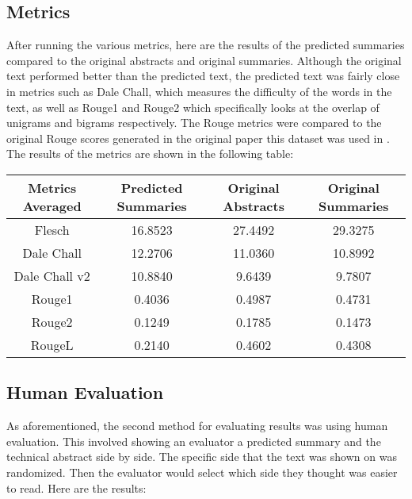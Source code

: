 \documentclass[11pt,a4paper]{article}
\begin{document}
\subsection{Metrics}

\indent \indent After running the various metrics, here are the results of the predicted summaries compared to the original abstracts and original summaries. Although the original text performed better than the predicted text, the predicted text was fairly close in metrics such as Dale Chall, which measures the difficulty of the words in the text, as well as Rouge1 and Rouge2 which specifically looks at the overlap of unigrams and bigrams respectively. The Rouge metrics were compared to the original Rouge scores generated in the original paper this dataset was used in \cite{luo2022readability}. The results of the metrics are shown in the following table:

\begin{table}
  \begin{center}
    \begin{adjustbox}{width=0.49\textwidth}
      \begin{tabular}{|c | c | c | c|} 
      \hline
      Metrics Averaged & Predicted Summaries & Original Abstracts & Original Summaries \\ [1ex] 
      \hline\hline
      Flesch & 16.8523 & 27.4492 & 29.3275 \\ [1ex]
      \hline
      Dale Chall & 12.2706 & 11.0360 & 10.8992 \\ [1ex]
      \hline
      Dale Chall v2 & 10.8840 & 9.6439 & 9.7807 \\ [1ex]
      \hline
      Rouge1 & 0.4036 & 0.4987 & 0.4731 \\ [1ex]
      \hline
      Rouge2 & 0.1249 & 0.1785 & 0.1473 \\ [1ex] 
      \hline
      RougeL & 0.2140 & 0.4602 & 0.4308 \\ [1ex] 
      \hline
      \end{tabular}
  \end{adjustbox}
  \end{center}
\end{table}    


\subsection{Human Evaluation}

\indent \indent As aforementioned, the second method for evaluating results was using human evaluation. This involved showing an evaluator a predicted summary and the technical abstract side by side. The specific side that the text was shown on was randomized. Then the evaluator would select which side they thought was easier to read. Here are the results:
\end{document}
